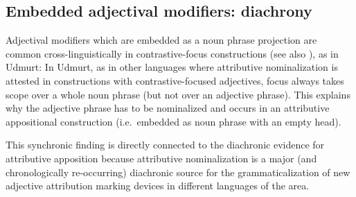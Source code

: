 \subsection{Embedded adjectival modifiers: diachrony}\label{embeddeddiachr}
Adjectival modifiers which are embedded as a noun phrase projection are common cross-linguistically in contrastive-focus constructions (see also ), as in Udmurt:
In Udmurt, as in other languages where attributive nominalization is attested in constructions with contrastive-focused adjectives, focus  always takes scope over a whole noun phrase (but not over an adjective phrase). This explains why the adjective phrase has to be nominalized and occurs in an attributive appositional construction (i.e.~embedded as noun phrase with an empty head).


This synchronic finding is directly connected to the diachronic evidence for attributive apposition because attributive nominalization is a major (and chronologically re-occurring) diachronic source for the grammaticalization of new adjective attribution marking devices in different languages of the area.


